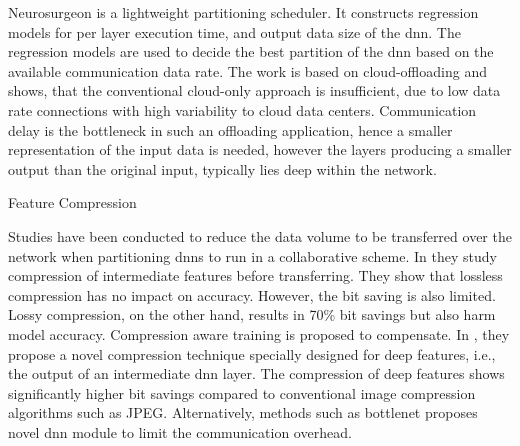 Neurosurgeon \cite{kang_neurosurgeon:_2017} is a lightweight partitioning scheduler. It constructs regression models for per layer execution time, and output data size of the \gls{dnn}. The regression models are used to decide the best partition of the \gls{dnn} based on the available communication data rate. The work is based on cloud-offloading and shows, that the conventional cloud-only approach is insufficient, due to low data rate connections with high variability to cloud data centers. Communication delay is the bottleneck in such an offloading application, hence a smaller representation of the input data is needed, however the layers producing a smaller output than the original input, typically lies deep within the network.
\begin{enumdescript}
	\item[Feature Compression] 
	
	Studies have been conducted to reduce the data volume to be transferred over the network when partitioning \gls{dnn}s to run in a collaborative scheme.  In \cite{choi_deep_2018} they study compression of intermediate features before transferring. They show that lossless compression has no impact on accuracy. However, the bit saving is also limited. Lossy compression, on the other hand, results in 70\% bit savings but also harm model accuracy. Compression aware training is proposed to compensate. In \cite{choi_near-lossless_2018}, they propose a novel compression technique specially designed for deep features, i.e., the output of an intermediate \gls{dnn} layer. The compression of deep features shows significantly higher bit savings compared to conventional image compression algorithms such as JPEG. Alternatively, methods such as \gls{bottlenet} \cite{eshratifar_bottlenet:_2019}  proposes novel \gls{dnn} module to limit the communication overhead.
	
	
	

\end{enumdescript}
